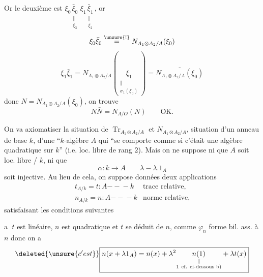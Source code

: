 Or le deuxième est $\xi_0\underset{\substack{\Vert\\\xi_3}}{\bar\xi_0}\,\xi_1\underset{\substack{\Vert\\\xi_2}}{\bar\xi_1}$, or
\[
 \xi_0\bar\xi_0\overset{\unsure{!}}{=}N_{A_1\otimes A_2/A}(\xi_0)
\]
\[
 \xi_1\bar\xi_1=N_{A_1\otimes A_2/A}\left(\underset{\substack{\Vert\\\sigma_1(\xi_0)}}{\xi_1}\right)
 =\overline{N_{A_1\otimes A_2/A}(\xi_0)}
\]
donc  $N=N_{A_1\otimes A_2/A}(\xi_0)$, on trouve
\[
 N\bar N=N_{A/O}(N)\qquad\text{OK}.
\]

On va axiomatiser la situation de  $\operatorname{Tr}_{A_1\otimes A_2/A}$ et $N_{A_1\otimes A_2/A}$,  situation d'un anneau de base $k$,  d'une ``$k$-algèbre $A$ qui ``se comporte comme si c'était une algèbre quadratique sur $k$'' (i.e. loc. libre de rang $2$). Mais on ne suppose ni que $A$ soit loc. libre  / $k$, ni que
\[
 \alpha:k\longrightarrow A\qquad\lambda\mathrel{-}\lambda.1_A
\]
soit injective. Au lieu de cela, on suppose données deux applications
\[
 \begin{array}{lll}
 t_{A/k}=t:A\mathrel{-\!\!-\!\!-}k&\text{trace relative},\\
 n_{A/k}=n:A\mathrel{-\!\!-\!\!-}k&\text{norme relative},
 \end{array}
\]
satisfaisant les conditions suivantes

\textcircled{a} $t$ est linéaire, $n$ est quadratique et $t$ se déduit de $n$, comme  $\varphi_n$ forme bil. ass. à $n$
donc on a
\[
 \deleted{\unsure{c'est}}\boxed{n(x+\lambda 1_A)=n(x)+\lambda^2\underset{\substack{\Vert\\1\ \text{cf. ci-dessous b)}}}{n(1)}+\lambda t(x)}
\]
